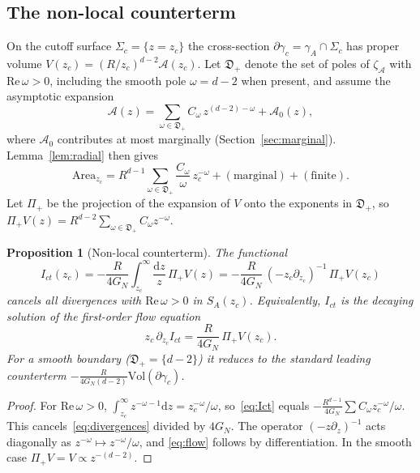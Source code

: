\documentclass[11pt]{article}
\newtheorem{proposition}{Proposition}[section]
\theoremstyle{definition}\newtheorem{definition}{Definition}[section]
\theoremstyle{remark}\newtheorem*{remark}{Remark}
\newcommand{\cA}{\mathcal{A}}
\newcommand{\cD}{\mathfrak{D}}
\newcommand{\dd}{\mathrm{d}}
\newcommand{\Vol}{\mathrm{Vol}}
\newcommand{\Area}{\mathrm{Area}}
\newcommand{\GN}{G_N}
\begin{document}
\subsection{The non-local counterterm}
On the cutoff surface $\Sigma_c=\{z=z_c\}$ the cross-section $\partial\gamma_c=\gamma_A\cap\Sigma_c$ has proper
volume $V(z_c)=(R/z_c)^{d-2}\cA(z_c)$. Let $\cD_+$ denote the set of poles of $\zeta_\cA$ with
$\mathrm{Re}\,\omega>0$, including the smooth pole $\omega=d-2$ when present, and assume the asymptotic
expansion
\begin{equation}
\cA(z)=\sum_{\omega\in\cD_+}C_\omega\,z^{(d-2)-\omega}+\cA_0(z),
\label{eq:asymptotic}
\end{equation}
where $\cA_0$ contributes at most marginally (Section~\ref{sec:marginal}). Lemma~\ref{lem:radial} then gives
\begin{equation}
\Area_{z_c}=R^{d-1}\sum_{\omega\in\cD_+}\frac{C_\omega}{\omega}\,z_c^{-\omega}+(\text{marginal})+(\text{finite}).
\label{eq:divergences}
\end{equation}
Let $\Pi_+$ be the projection of the expansion of $V$ onto the exponents in $\cD_+$, so
$\Pi_+V(z)=R^{d-2}\sum_{\omega\in\cD_+}C_\omega z^{-\omega}$.

\begin{proposition}[Non-local counterterm]
\label{prop:ct}
The functional
\begin{equation}
I_{ct}(z_c)=-\frac{R}{4\GN}\int_{z_c}^{\infty}\frac{\dd z}{z}\,\Pi_+V(z)
=-\frac{R}{4\GN}\,(-z_c\partial_{z_c})^{-1}\,\Pi_+V(z_c)
\label{eq:Ict}
\end{equation}
cancels all divergences with $\mathrm{Re}\,\omega>0$ in $S_A(z_c)$. Equivalently, $I_{ct}$ is the decaying
solution of the first-order flow equation
\begin{equation}
z_c\,\partial_{z_c}I_{ct}=\frac{R}{4\GN}\,\Pi_+V(z_c).
\label{eq:flow}
\end{equation}
For a smooth boundary ($\cD_+=\{d-2\}$) it reduces to the standard leading counterterm
$-\frac{R}{4\GN(d-2)}\Vol(\partial\gamma_c)$.
\end{proposition}
\begin{proof}
For $\mathrm{Re}\,\omega>0$, $\int_{z_c}^\infty z^{-\omega-1}\dd z=z_c^{-\omega}/\omega$, so~\eqref{eq:Ict} equals
$-\frac{R^{d-1}}{4\GN}\sum C_\omega z_c^{-\omega}/\omega$. This cancels~\eqref{eq:divergences} divided by
$4\GN$. The operator $(-z\partial_z)^{-1}$ acts diagonally as $z^{-\omega}\mapsto z^{-\omega}/\omega$, and
\eqref{eq:flow} follows by differentiation. In the smooth case $\Pi_+V=V\propto z^{-(d-2)}$.
\end{proof}
\end{document}
